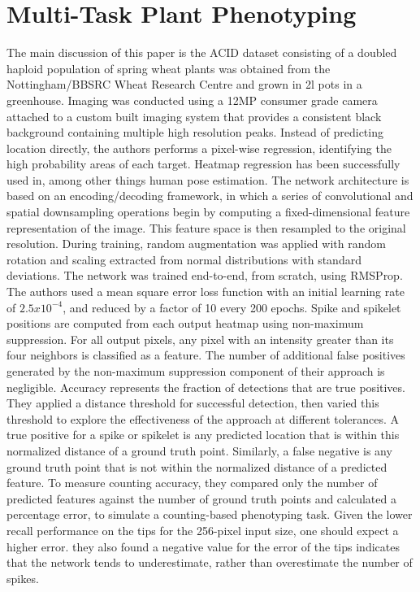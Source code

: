 \section{Multi-Task Plant Phenotyping}
The main discussion of this paper is the ACID dataset consisting of a doubled haploid population of spring wheat plants was obtained from the Nottingham/BBSRC
Wheat Research Centre and grown in 2l pots in a greenhouse. Imaging was conducted using a 12MP consumer grade camera attached to a custom built imaging system
that provides a consistent black background containing multiple high resolution peaks. Instead of predicting location directly, the authors performs a pixel-wise regression,
identifying the high probability areas of each target. Heatmap regression has been successfully used in, among other things human pose estimation. The network
architecture is based on an encoding/decoding framework, in which a series of convolutional and spatial downsampling operations begin by computing a fixed-dimensional
feature representation of the image. This feature space is then resampled to the original resolution. During training, random augmentation was applied with random
rotation and scaling extracted from normal distributions with standard deviations. The network was trained end-to-end, from scratch, using RMSProp. The authors used
a mean square error loss function with an initial learning rate of $2.5x10^{-4}$, and reduced by a factor of 10 every 200 epochs. Spike and spikelet positions
are computed from each output heatmap using non-maximum suppression. For all output pixels, any pixel with an intensity greater than its four neighbors is classified
as a feature. The number of additional false positives generated by the non-maximum suppression component of their approach is negligible. Accuracy represents the
fraction of detections that are true positives. They applied a distance threshold for successful detection, then varied this threshold to explore the effectiveness
of the approach at different tolerances. A true positive for a spike or spikelet is any predicted location that is within this normalized distance of a ground truth
point. Similarly, a false negative is any ground truth point that is not within the normalized distance of a predicted feature. To measure counting accuracy, they
compared only the number of predicted features against the number of ground truth points and calculated a percentage error, to simulate a counting-based phenotyping
task. Given the lower recall performance on the tips for the 256-pixel input size, one should expect a higher error. they also found a negative value for the error
of the tips indicates that the network tends to underestimate, rather than overestimate the number of spikes.

